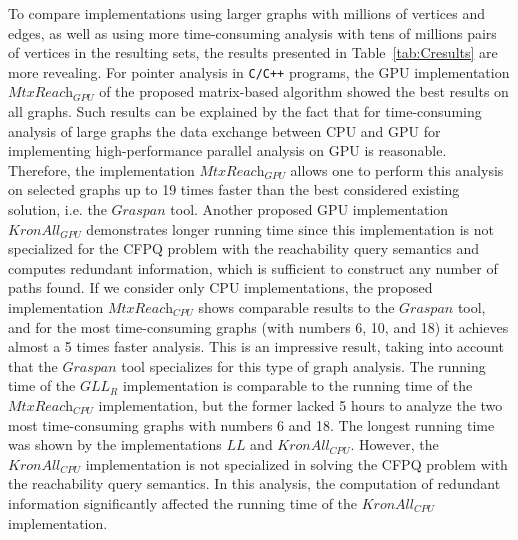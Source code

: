 To compare implementations using larger graphs with millions of vertices and edges, as well as using more time-consuming analysis with tens of millions pairs of vertices in the resulting sets, the results presented in Table~\ref{tab:Cresults} are more revealing. For pointer analysis in \texttt{C/C++} programs, the GPU implementation $\textit{MtxReach}_{\textit{GPU}}$ of the proposed matrix-based algorithm showed the best results on all graphs. Such results can be explained by the fact that for time-consuming analysis of large graphs the data exchange between CPU and GPU for implementing high-performance parallel analysis on GPU is reasonable. Therefore, the implementation $\textit{MtxReach}_{\textit{GPU}}$ allows one to perform this analysis on selected graphs up to 19 times faster than the best considered existing solution, i.e. the $\textit{Graspan}$ tool. Another proposed GPU implementation $\textit{KronAll}_{\textit{GPU}}$ demonstrates longer running time since this implementation is not specialized for the CFPQ problem with the reachability query semantics and computes redundant information, which is sufficient to construct any number of paths found. If we consider only CPU implementations, the proposed implementation $\textit{MtxReach}_{\textit{CPU}}$ shows comparable results to the $\textit{Graspan}$ tool, and for the most time-consuming graphs (with numbers 6, 10, and 18) it achieves almost a 5 times faster analysis. This is an impressive result, taking into account that the $\textit{Graspan}$ tool specializes for this type of graph analysis. The running time of the $\textit{GLL}_{\textit{R}}$ implementation is comparable to the running time of the $\textit{MtxReach}_{\textit{CPU}}$ implementation, but the former lacked 5 hours to analyze the two most time-consuming graphs with numbers 6 and 18. The longest running time was shown by the implementations $\textit{LL}$ and $\textit{KronAll}_{\textit{CPU}}$. However, the $\textit{KronAll}_{\textit{CPU}}$ implementation is not specialized in solving the CFPQ problem with the reachability query semantics. In this analysis, the computation of redundant information significantly affected the running time of the $\textit{KronAll}_{\textit{CPU}}$ implementation.

